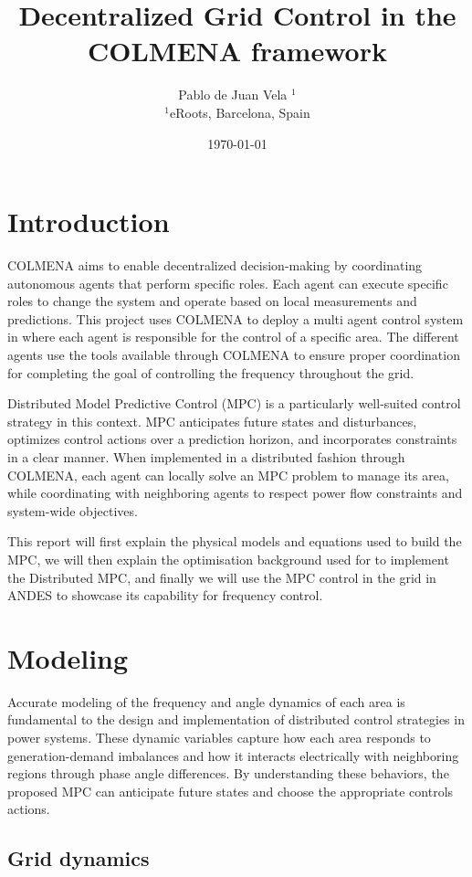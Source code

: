 \documentclass{article}
\title{Decentralized Grid Control in the COLMENA framework}
\author{Pablo de Juan Vela $^{1}$ \\
        \small $^{1}$eRoots, Barcelona, Spain \\
}
\date{\today}
\begin{document}
\maketitle
\section{Introduction}

COLMENA aims to enable decentralized decision-making by coordinating autonomous agents that perform specific roles. Each agent can execute specific roles to change the system and operate based on local measurements and predictions. This project uses COLMENA to deploy a multi agent control system in where each agent is responsible for the control of a specific area. The different agents use the tools available through COLMENA to ensure proper coordination for completing the goal of controlling the frequency throughout the grid.

Distributed Model Predictive Control (MPC) is a particularly well-suited control strategy in this context. MPC anticipates future states and disturbances, optimizes control actions over a prediction horizon, and incorporates constraints in a clear manner. When implemented in a distributed fashion through COLMENA, each agent can locally solve an MPC problem to manage its area, while coordinating with neighboring agents to respect power flow constraints and system-wide objectives.

This report will first explain the physical models and equations used to build the MPC, we will then explain the optimisation background used for to implement the Distributed MPC, and finally we will use the MPC control in the grid \cite{grids:ieee39} in ANDES to showcase its capability for frequency control.

\section{Modeling}

Accurate modeling of the frequency and angle dynamics of each area is fundamental to the design and implementation of distributed control strategies in power systems. These dynamic variables capture how each area responds to generation-demand imbalances and how it interacts electrically with neighboring regions through phase angle differences. By understanding these behaviors, the proposed MPC can anticipate future states and choose the appropriate controls actions.

\subsection*{Grid dynamics}
\end{document}
